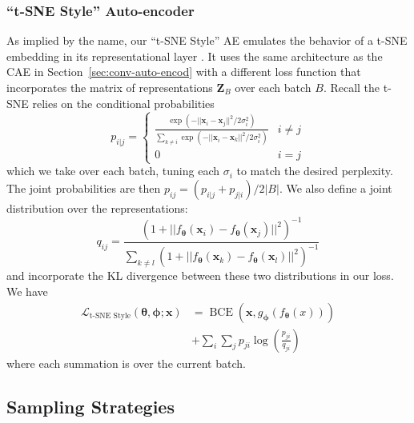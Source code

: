 \documentclass[a4paper]{article}
\def\vec#1{\ensuremath{\bm{{#1}}}}
\def\mat#1{\vec{#1}}
\DeclareMathOperator{\bce}{BCE}
\begin{document}
\subsubsection{``t-SNE Style'' Auto-encoder}
\label{sec:t-sne-style}

As implied by the name, our ``t-SNE Style'' AE emulates the behavior of a t-SNE
embedding in its representational layer \cite{maaten_learning_2009}. It uses the
same architecture as the CAE in Section~\ref{sec:conv-auto-encod} with a
different loss function that incorporates the matrix of representations
$\mat{Z}_B$ over each batch $B$. Recall the t-SNE relies on the conditional
probabilities
\begin{equation}
  \label{eq:5}
  p_{i|j} =
  \begin{cases}
    \frac{\exp(-||\vec{x}_i - \vec{x}_j||^2 / 2\sigma_i^2)}
    {\sum_{k\neq i}\exp(-||\vec{x}_i - \vec{x}_k||^2 / 2\sigma_i^2)}
    & i \neq j \\
    0 & i = j
  \end{cases}
\end{equation}
which we take over each batch, tuning each $\sigma_i$ to match the desired
perplexity. The joint probabilities are then
$p_{ij} = (p_{i|j} + p_{j|i})/2|B|$. We also define a joint distribution over
the representations:
\begin{equation}
  \label{eq:7}
  q_{ij} = \frac%
  {\left(1 + ||f_{\vec{\theta}}(\vec{x}_i) -
      f_{\vec{\theta}}(\vec{x}_j)||^2\right)^{-1}} %
  {\sum_{k\neq l} \left(1 + ||f_{\vec{\theta}}(\vec{x}_k) -
      f_{\vec{\theta}}(\vec{x}_l)||^2\right)^{-1}}
\end{equation}
and incorporate the KL divergence between these two distributions in our
loss. We have
\begin{equation}
  \label{eq:6}
  \begin{split}
    \mathcal{L}_{\text{t-SNE Style}}(\vec{\theta}, \vec{\phi};\vec{x})
    & = \bce(\vec{x},g_{\vec{\phi}}(f_{\vec{\theta}}(x))) \\
    & + \sum_i \sum_j p_{ji} \log \left( \frac{p_{ji}}{q_{ji}} \right)
  \end{split}
\end{equation}
where each summation is over the current batch.

\subsection{Sampling Strategies}
\label{sec:sampling-strategies}
\end{document}
